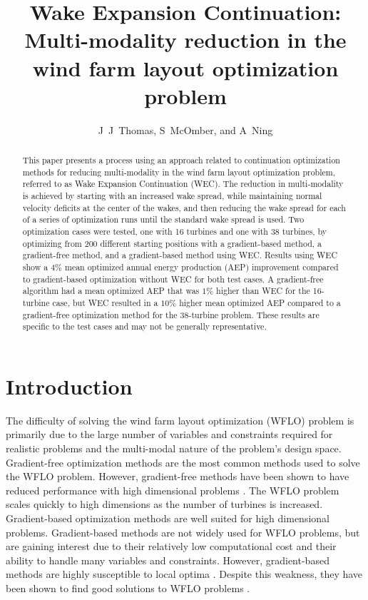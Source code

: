 \documentclass[a4paper]{jpconf}
\begin{document}
\title{Wake Expansion Continuation: \large{Multi-modality reduction in the wind farm layout optimization problem}}

\author{J~J~Thomas, S~McOmber, and A~Ning}
\address{Department of Mechanical Engineering,
Brigham Young University, Provo, Utah, USA}

\begin{abstract}
	This paper presents a process using an approach related to  continuation optimization methods for reducing multi-modality in the wind farm layout optimization problem, referred to as Wake Expansion Continuation (WEC). The reduction in multi-modality is achieved by starting with an increased wake spread, while maintaining normal velocity deficits at the center of the wakes, and then reducing the wake spread for each of a series of optimization runs until the standard wake spread is used. Two optimization cases were tested, one with 16 turbines and one with 38 turbines, by optimizing from 200 different starting positions with a gradient-based method, a gradient-free method, and a gradient-based method using WEC. Results using WEC show a $4\%$ mean optimized annual energy production (AEP) improvement compared to gradient-based optimization without WEC for both test cases. A gradient-free algorithm had a mean optimized AEP that was $1\%$ higher than WEC for the 16-turbine case, but WEC resulted in a $10\%$ higher mean optimized AEP compared to a gradient-free optimization method for the 38-turbine problem. These results are specific to the test cases and may not be generally representative.
\end{abstract}

\section{Introduction}

The difficulty of solving the wind farm layout optimization (WFLO) problem is primarily due to the large number of variables and constraints required for realistic problems and the multi-modal nature of the problem's design space. Gradient-free optimization methods are the most common methods used to solve the WFLO problem. However, gradient-free methods have been shown to have reduced performance with high dimensional problems \cite{rios2013-grad-free-comparison}. The WFLO problem scales quickly to high dimensions as the number of turbines is increased. Gradient-based optimization methods are well suited for high dimensional problems. Gradient-based methods are not widely used for WFLO problems, but are gaining interest due to their relatively low computational cost and their ability to handle many variables and constraints. However, gradient-based methods are highly susceptible to local optima \cite{acero2014}. Despite this weakness, they have been shown to find good solutions to WFLO problems \cite{fleming2015, guirguis2016, gebraad2017-Maximization-Annual}.  
\end{document}
